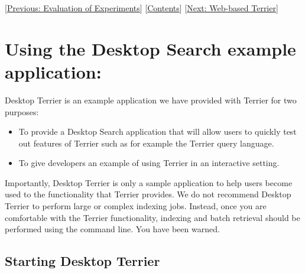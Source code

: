 {[}\href{evaluation.html}{Previous: Evaluation of Experiments}{]}
{[}\href{index.html}{Contents}{]} {[}\href{terrier_http.html}{Next:
Web-based Terrier}{]}\\

\section{Using the Desktop Search example
application:}\label{using-the-desktop-search-example-application}

Desktop Terrier is an example application we have provided with Terrier
for two purposes:

\begin{itemize}
\tightlist
\item
  To provide a Desktop Search application that will allow users to
  quickly test out features of Terrier such as for example the Terrier
  query language.
\item
  To give developers an example of using Terrier in an interactive
  setting.
\end{itemize}

Importantly, Desktop Terrier is only a sample application to help users
become used to the functionality that Terrier provides. We do not
recommend Desktop Terrier to perform large or complex indexing jobs.
Instead, once you are comfortable with the Terrier functionality,
indexing and batch retrieval should be performed using the command line.
You have been warned.

\subsection{Starting Desktop Terrier}\label{starting-desktop-terrier}

